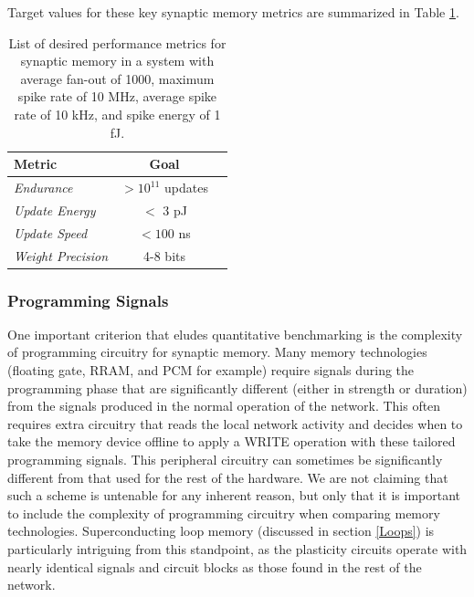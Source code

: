 \documentclass[twocolumn]{article}
\begin{document}
Target values for these key synaptic memory metrics are summarized in Table \ref{tab:memory_metrics}.

\begin{table}[h!]
  \begin{center}
    \label{tab:memory_metrics}
    \begin{tabular}{l|c|r} %
      \textbf{Metric} & \textbf{Goal} \\
      \hline
      \textit{Endurance} & $>10^{11}$ updates \\
      \textit{Update Energy} & $<$ 3 pJ\\
      \textit{Update Speed} & $<100$ ns \\
      \textit{Weight Precision} & 4-8 bits
      
    \end{tabular}
    \caption{List of desired performance metrics for synaptic memory in a system with average fan-out of 1000, maximum spike rate of 10 MHz, average spike rate of 10 kHz, and spike energy of 1 fJ.}
  \end{center}
\end{table}

\subsubsection{Programming Signals}
One important criterion that eludes quantitative benchmarking is the complexity of programming circuitry for synaptic memory. Many memory technologies (floating gate, RRAM, and PCM for example) require signals during the programming phase that are significantly different (either in strength or duration) from the signals produced in the normal operation of the network. This often requires extra circuitry that reads the local network activity and decides when to take the memory device offline to apply a WRITE operation with these tailored programming signals. This peripheral circuitry can sometimes be significantly different from that used for the rest of the hardware. We are not claiming that such a scheme is untenable for any inherent reason, but only that it is important to include the complexity of programming circuitry when comparing memory technologies. Superconducting loop memory (discussed in section \ref{Loops}) is particularly intriguing from this standpoint, as the plasticity circuits operate with  nearly identical signals and circuit blocks as those found in the rest of the network.
\end{document}
